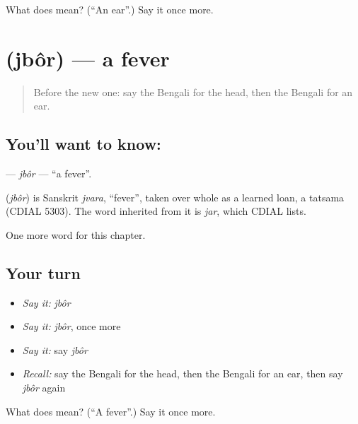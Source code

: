 \begin{tcolorbox}[breakable,colback=teal!4,colframe=teal!35!black,title={Before you move on}]
What does  mean? (\textquotedblleft{}An ear\textquotedblright{}.) Say it once more.
\end{tcolorbox}
\section[\texorpdfstring{\bn{জ্বর} (jbôr)}{জ্বর (jbôr)}]{ (jbôr) — a fever}

\label{lesson:BN-C44-jbor}



\begin{quote}
Before the new one: say the Bengali for the head, then the Bengali for an ear.
\end{quote}

\subsection*{You'll want to know: }
\textbf{} — \emph{jbôr} — \textquotedblleft{}a fever\textquotedblright{}.

\begin{cousinweb}
\textbf{} (\emph{jbôr}) is Sanskrit \emph{jvara}, \textquotedblleft{}fever\textquotedblright{}, taken over whole as a learned loan, a tatsama (CDIAL 5303). The word inherited from it is \emph{jar}, which CDIAL lists.
\end{cousinweb}

\begin{grammarlens}[title={What you've built}]
One more word for this chapter.
\end{grammarlens}

\subsection*{Your turn}
\begin{itemize}
\raggedright
  \item \emph{Say it:} \emph{jbôr}
  \item \emph{Say it:} \emph{jbôr}, once more
  \item \emph{Say it:} say \emph{jbôr}
  \item \emph{Recall:} say the Bengali for the head, then the Bengali for an ear, then say \emph{jbôr} again
\end{itemize}

\begin{tcolorbox}[breakable,colback=teal!4,colframe=teal!35!black,title={Before you move on}]
What does  mean? (\textquotedblleft{}A fever\textquotedblright{}.) Say it once more.
\end{tcolorbox}
